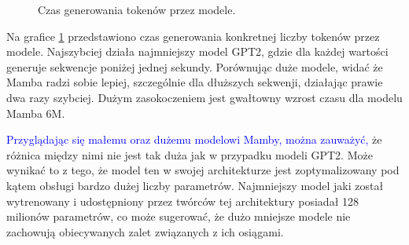\documentclass[data-science]{agh-wi} %
\begin{document}
\begin{figure}
    \centering
    \caption{Czas generowania tokenów przez modele.}\label{fig:time_generate}
\end{figure}

Na grafice \ref*{fig:time_generate} przedstawiono czas generowania konkretnej liczby tokenów przez modele. Najszybciej działa najmniejszy model GPT2, gdzie dla każdej wartości generuje sekwencje poniżej jednej sekundy. Porównując duże modele, widać że Mamba radzi sobie lepiej, szczególnie dla dłuższych sekwenji, działając prawie dwa razy szybciej. Dużym zasokoczeniem jest gwałtowny wzrost czasu dla modelu Mamba 6M.

\textcolor{blue}{Przyglądając się małemu oraz dużemu modelowi Mamby, można zauważyć, }że różnica między nimi nie jest tak duża jak w przypadku modeli GPT2. Może wynikać to z tego, że model ten w swojej architekturze jest zoptymalizowany pod kątem obsługi bardzo dużej liczby parametrów. Najmniejszy model jaki został wytrenowany i udostępniony przez twórców tej architektury posiadał 128 milionów parametrów, co może sugerować, że dużo mniejsze modele nie zachowują obiecywanych zalet związanych z ich osiągami.
\end{document}
